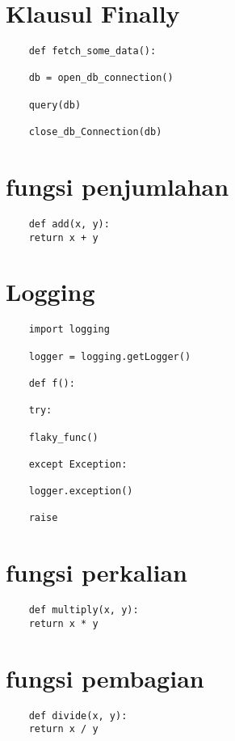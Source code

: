 \documentclass{article}
\begin{document}
\section {Klausul Finally}
\begin{lstlisting}
	def fetch_some_data():
	
	db = open_db_connection()
	
	query(db)
	
	close_db_Connection(db)
\end{lstlisting}

\section {fungsi penjumlahan}
\begin{lstlisting}
	def add(x, y):
	return x + y
\end{lstlisting}

\section {Logging}
\begin{lstlisting}
	import logging
	
	logger = logging.getLogger()
	
	def f():
	
	try:
	
	flaky_func()
	
	except Exception:
	
	logger.exception()
	
	raise
\end{lstlisting}

\section {fungsi perkalian}
\begin{lstlisting}
	def multiply(x, y):
	return x * y
\end{lstlisting}

\section {fungsi pembagian}
\begin{lstlisting}
	def divide(x, y):
	return x / y
\end{lstlisting}
\end{document}
